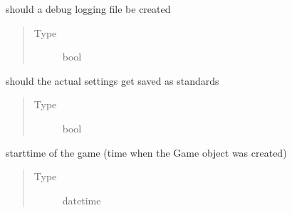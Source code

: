 \documentclass[letterpaper,10pt,english]{sphinxmanual}
\begin{document}
\begin{fulllineitems}
\begin{fulllineitems}
\begin{quote}
\begin{description}
\end{description}\end{quote}

\end{fulllineitems}


\begin{fulllineitems}
\label{\detokenize{chatwolf:chatwolf.game.Game.do_debug}}
should a debug logging file be created
\begin{quote}\begin{description}
\item[{Type}] \leavevmode
bool

\end{description}\end{quote}

\end{fulllineitems}


\begin{fulllineitems}
\label{\detokenize{chatwolf:chatwolf.game.Game.do_save_conf}}
should the actual settings get saved as standards
\begin{quote}\begin{description}
\item[{Type}] \leavevmode
bool

\end{description}\end{quote}

\end{fulllineitems}


\begin{fulllineitems}
\label{\detokenize{chatwolf:chatwolf.game.Game.starttime}}
starttime of the game (time when the Game object was created)
\begin{quote}\begin{description}
\item[{Type}] \leavevmode
datetime


\end{description}
\end{quote}
\end{fulllineitems}
\end{fulllineitems}
\end{document}
